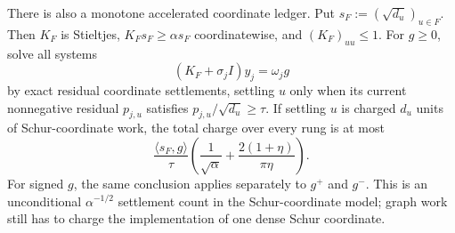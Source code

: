 \begin{theorem}
There is also a monotone accelerated coordinate ledger.  Put
$s_F:=(\sqrt{d_u})_{u\in F}$.  Then $K_F$ is Stieltjes,
$K_Fs_F\geq\alpha s_F$ coordinatewise, and
$(K_F)_{uu}\leq1$.  For $g\geq0$, solve all systems
\begin{equation*}
 (K_F+\sigma_jI)y_j=\omega_jg
\end{equation*}
by exact residual coordinate settlements, settling $u$ only when its current
nonnegative residual $p_{j,u}$ satisfies
$p_{j,u}/\sqrt{d_u}\geq\tau$.  If settling $u$ is charged $d_u$ units of
Schur-coordinate work, the total charge over every rung is at most
\begin{equation}
 \frac{\langle s_F,g\rangle}{\tau}
 \left(
  \frac1{\sqrt\alpha}
  +\frac{2(1+\eta)}{\pi\eta}
 \right).
 \label{eq:positive-resolvent-coordinate-work}
\end{equation}
For signed $g$, the same conclusion applies separately to $g^+$ and $g^-$.
This is an unconditional $\alpha^{-1/2}$ settlement count in the
Schur-coordinate model; graph work still has to charge the implementation of
one dense Schur coordinate.
\end{theorem}

